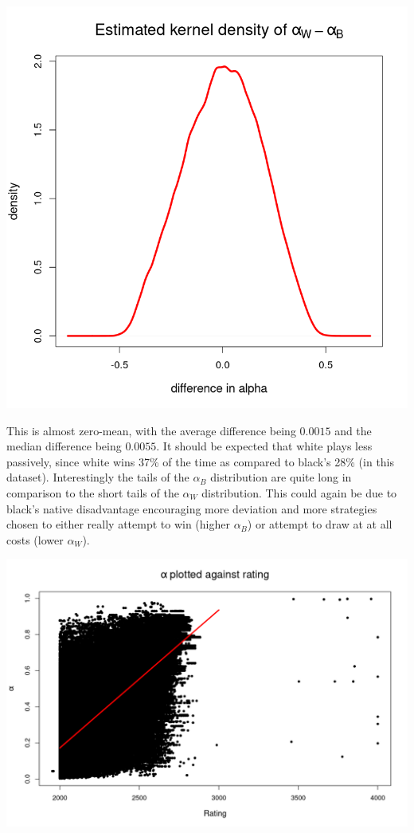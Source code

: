 \documentclass{article}
\begin{document}
\includegraphics[width=\textwidth]{./diff.png}

This is almost zero-mean, with the average difference being $0.0015$ and the median difference being $0.0055$.
It should be expected that white plays less passively, since white wins 37\% of the time as compared
to black's 28\%
(in this dataset).
Interestingly the tails of the $\alpha_B$ distribution are quite long in comparison to the short tails of the $\alpha_W$ distribution.
This could again be due to black's native disadvantage encouraging more deviation and more strategies chosen
to either really attempt to win (higher $\alpha_B$) or attempt to draw at at all costs (lower $\alpha_W$).

\includegraphics[width=\textwidth]{./linear.png}
\end{document}
